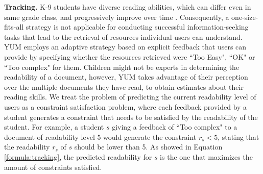 \documentclass{sig-alternate-05-2015}
\begin{document}
\noindent
\textbf{Tracking.} K-9 students have diverse reading abilities, which can differ even in same grade class, and progressively improve over time \cite{sh13}. Consequently, a one-size-fits-all strategy is not applicable for conducting successful information-seeking tasks that lead to the retrieval of resources individual users can understand. YUM employs an adaptive strategy based on explicit feedback that users can provide by specifying whether the resources retrieved were ``Too Easy", ``OK" or ``Too complex" for them. Children might not be experts in determining the readability of a document, however, YUM takes advantage of their perception over the multiple documents they have read, to obtain estimates about their reading skills.    
We treat the problem of predicting the current readability level of users as a constraint satisfaction problem, where each feedback  provided by a student  generates  a constraint that needs to be satisfied by the readability of the student. For example, a student $s$ giving a feedback of ``Too complex" to a document of readability level 5 would generate the constraint $r_s < 5$, stating that the readability $r_s$ of $s$ should be lower than 5. As showed in Equation \ref{formula:tracking}, the predicted readability for $s$ is the one that maximizes the amount of constraints satisfied.
\end{document}
